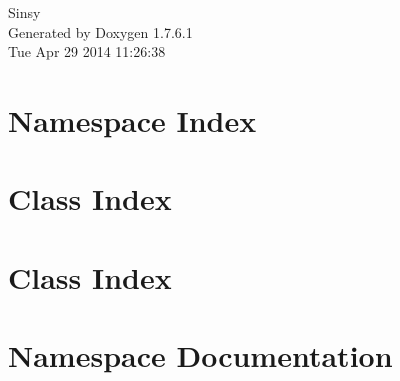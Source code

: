 \documentclass[a4paper]{book}
\begin{document}
\hypersetup{pageanchor=false,citecolor=blue}
\begin{titlepage}
\vspace*{7cm}
\begin{center}
{\Large \-Sinsy }\\
\vspace*{1cm}
{\large \-Generated by Doxygen 1.7.6.1}\\
\vspace*{0.5cm}
{\small Tue Apr 29 2014 11:26:38}\\
\end{center}
\end{titlepage}
\clearemptydoublepage
{}
\tableofcontents
\clearemptydoublepage
{}
\hypersetup{pageanchor=true,citecolor=blue}
\chapter{\-Namespace \-Index}

\chapter{\-Class \-Index}

\chapter{\-Class \-Index}

\chapter{\-Namespace \-Documentation}

\end{document}
